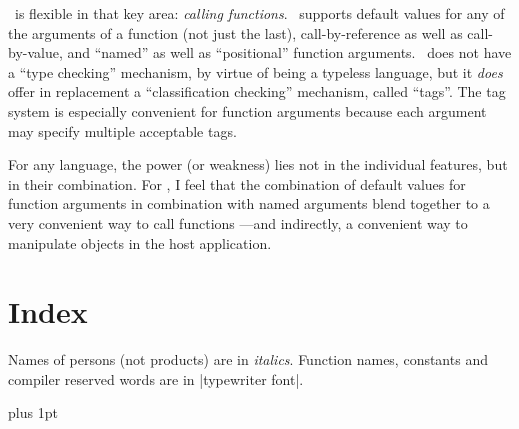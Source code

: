 \Small\ is flexible in that key area: {\it calling functions}. \Small\ supports default
values for any of the arguments of a function (not just the last),
call-by-reference as well as call-by-value, and ``named'' as well as ``positional''
function arguments. \Small\ does not have a ``type checking'' mechanism, by
virtue of being a typeless language, but it {\it does\/} offer in replacement
a ``classification checking'' mechanism, called ``tags''. The tag system is
especially convenient for function arguments because each argument may specify
multiple acceptable tags.

For any language, the power (or weakness) lies not in the individual features,
but in their combination. For \Small, I feel that the combination of default
values for function arguments in combination with named arguments blend together
to a very convenient way to call functions ---and indirectly, a convenient way
to manipulate objects in the host application.

%
%

%
%

 \vfill\eject

 


\forceoddpage   %
\chapter{Index}

\bigskip
\beginlist{1em}\compactlist
\list{\lbullet} Names of persons (not products) are in {\it italics}.
\list{\lbullet} Function names, constants and compiler reserved words are
  in |typewriter font|.
\endlist
\bigskip

\begingroup\parskip=0pt plus 1pt
\hfuzz=3pt
\endgroup

\bye

